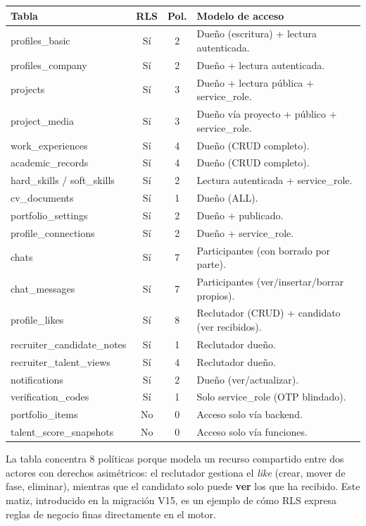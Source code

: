 \vspace{0.2cm}
\noindent
\renewcommand{\arraystretch}{1.2}
\fontsize{8}{9.6}\selectfont\sffamily
\begin{tabularx}{\textwidth}{|>{\ttfamily\scriptsize\color{colorPrimario}}l|c|c|X|}
\hline
\rowcolor{headerTabla}
\sffamily\textbf{Tabla} & \sffamily\textbf{RLS} & \sffamily\textbf{Pol.} & \sffamily\textbf{Modelo de acceso} \\
\hline
profiles\_basic & Sí & 2 & Dueño (escritura) + lectura autenticada. \\ \hline
profiles\_company & Sí & 2 & Dueño + lectura autenticada. \\ \hline
\rowcolor{grisTecnico}
projects & Sí & 3 & Dueño + lectura pública + service\_role. \\ \hline
project\_media & Sí & 3 & Dueño vía proyecto + público + service\_role. \\ \hline
\rowcolor{grisTecnico}
work\_experiences & Sí & 4 & Dueño (CRUD completo). \\ \hline
academic\_records & Sí & 4 & Dueño (CRUD completo). \\ \hline
\rowcolor{grisTecnico}
hard\_skills / soft\_skills & Sí & 2 & Lectura autenticada + service\_role. \\ \hline
cv\_documents & Sí & 1 & Dueño (ALL). \\ \hline
\rowcolor{grisTecnico}
portfolio\_settings & Sí & 2 & Dueño + publicado. \\ \hline
profile\_connections & Sí & 2 & Dueño + service\_role. \\ \hline
\rowcolor{grisTecnico}
chats & Sí & 7 & Participantes (con borrado por parte). \\ \hline
chat\_messages & Sí & 7 & Participantes (ver/insertar/borrar propios). \\ \hline
\rowcolor{grisTecnico}
profile\_likes & Sí & 8 & Reclutador (CRUD) + candidato (ver recibidos). \\ \hline
recruiter\_candidate\_notes & Sí & 1 & Reclutador dueño. \\ \hline
\rowcolor{grisTecnico}
recruiter\_talent\_views & Sí & 4 & Reclutador dueño. \\ \hline
notifications & Sí & 2 & Dueño (ver/actualizar). \\ \hline
\rowcolor{grisTecnico}
verification\_codes & Sí & 1 & Solo service\_role (OTP blindado). \\ \hline
portfolio\_items & No & 0 & Acceso solo vía backend. \\ \hline
\rowcolor{grisTecnico}
talent\_score\_snapshots & No & 0 & Acceso solo vía funciones. \\ \hline
\end{tabularx}
\label{tab:cobertura-rls}

\clearpage
\begin{AvisoNota}
La tabla  concentra 8 políticas porque modela un recurso
compartido entre dos actores con derechos asimétricos: el reclutador gestiona el
\textit{like} (crear, mover de fase, eliminar), mientras que el candidato solo puede
\textbf{ver} los que ha recibido. Este matiz, introducido en la migración V15, es un
ejemplo de cómo RLS expresa reglas de negocio finas directamente en el motor.
\end{AvisoNota}
